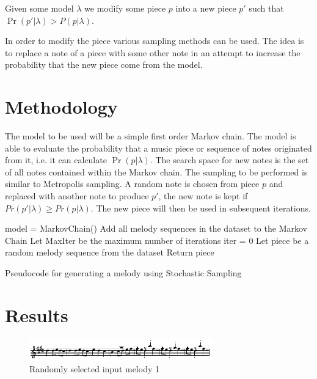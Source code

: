 Given some model $\lambda$ we modify some piece $p$ into a new piece $p'$ such that $\Pr(p'|\lambda) > P(p|\lambda)$.


In order to modify the piece various sampling methods can be used. The idea is to replace a note of a piece with some other note in an attempt to increase the probability that the new piece come from the model. 

\section{Methodology}
The model to be used will be a simple first order Markov chain. The model is able to evaluate the probability that a music piece or sequence of notes originated from it, i.e. it can calculate $\Pr(p|\lambda)$. The search space for new notes is the set of all notes contained within the Markov chain.
The sampling to be performed is similar to Metropolis sampling. A random note is chosen from piece $p$ and replaced with another note to produce $p'$, the new note is kept if $Pr(p'|\lambda) \geq Pr(p|\lambda)$. The new piece will then be used in subsequent iterations.

\begin{algorithm}
 model = MarkovChain()\;
 Add all melody sequences in the dataset to the Markov Chain\;
 Let MaxIter be the maximum number of iterations\;
 iter = 0\;
 Let piece be a random melody sequence from the dataset\;
 Return piece\;
 \caption{Pseudocode for generating a melody using Stochastic Sampling}
\end{algorithm}

\section{Results}
\begin{figure}[h!]
\centerline{\includegraphics[width=300px]{../images/swr_in.pdf}}
\caption{Randomly selected input melody 1}
\label{ims:swr_in}
\end{figure}

